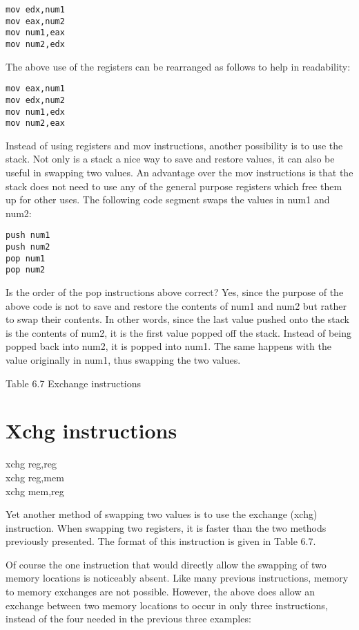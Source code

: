 \documentclass[10pt]{article}
\begin{document}
\begin{verbatim}
mov edx,num1
mov eax,num2
mov num1,eax
mov num2,edx
\end{verbatim}

The above use of the registers can be rearranged as follows to help in readability:

\begin{verbatim}
mov eax,num1
mov edx,num2
mov num1,edx
mov num2,eax
\end{verbatim}

Instead of using registers and mov instructions, another possibility is to use the stack. Not only is a stack a nice way to save and restore values, it can also be useful in swapping two values. An advantage over the mov instructions is that the stack does not need to use any of the general purpose registers which free them up for other uses. The following code segment swaps the values in num1 and num2:

\begin{verbatim}
push num1
push num2
pop num1
pop num2
\end{verbatim}

Is the order of the pop instructions above correct? Yes, since the purpose of the above code is not to save and restore the contents of num1 and num2 but rather to swap their contents. In other words, since the last value pushed onto the stack is the contents of num2, it is the first value popped off the stack. Instead of being popped back into num2, it is popped into num1. The same happens with the value originally in num1, thus swapping the two values.

Table 6.7 Exchange instructions

\section*{Xchg instructions}
xchg reg,reg\\
xchg reg,mem\\
xchg mem,reg

Yet another method of swapping two values is to use the exchange (xchg) instruction. When swapping two registers, it is faster than the two methods previously presented. The format of this instruction is given in Table 6.7.

Of course the one instruction that would directly allow the swapping of two memory locations is noticeably absent. Like many previous instructions, memory to memory exchanges are not possible. However, the above does allow an exchange between two memory locations to occur in only three instructions, instead of the four needed in the previous three examples:
\end{document}
